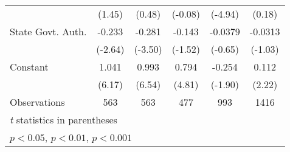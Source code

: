 \begin{table}[htbp]
\begin{tabular}{l*{5}{c}}
                                        &   (1.45)         &   (0.48)         &  (-0.08)         &  (-4.94)         &   (0.18)         \\
\addlinespace
State Govt. Auth.                       &   -0.233\sym{**} &   -0.281\sym{***}&   -0.143         &  -0.0379         &  -0.0313         \\
                                        &  (-2.64)         &  (-3.50)         &  (-1.52)         &  (-0.65)         &  (-1.03)         \\
\addlinespace
Constant                                &    1.041\sym{***}&    0.993\sym{***}&    0.794\sym{***}&   -0.254         &    0.112\sym{*}  \\
                                        &   (6.17)         &   (6.54)         &   (4.81)         &  (-1.90)         &   (2.22)         \\
\midrule
Observations                            &      563         &      563         &      477         &      993         &     1416         \\
\bottomrule
\multicolumn{6}{l}{\footnotesize \textit{t} statistics in parentheses}\\
\multicolumn{6}{l}{\footnotesize \sym{*} \(p<0.05\), \sym{**} \(p<0.01\), \sym{***} \(p<0.001\)}\\
\end{tabular}
\end{table}
